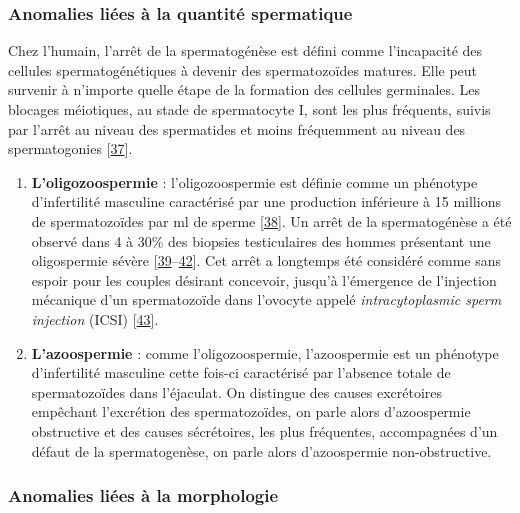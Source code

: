 \documentclass[12pt,twoside]{reedthesis}
\theoremstyle{definition}
\theoremstyle{definition}
\theoremstyle{remark}
\begin{document}
  \newpage
  
  \subsubsection{Anomalies liées à la quantité
  spermatique}\label{infquant}
  
  Chez l'humain, l'arrêt de la spermatogénèse est défini comme
  l'incapacité des cellules spermatogénétiques à devenir des
  spermatozoïdes matures. Elle peut survenir à n'importe quelle étape de
  la formation des cellules germinales. Les blocages méiotiques, au stade
  de spermatocyte I, sont les plus fréquents, suivis par l'arrêt au niveau
  des spermatides et moins fréquemment au niveau des spermatogonies
  {[}\protect\hyperlink{ref-Girgis}{37}{]}.
  
  \begin{enumerate}
  \def\labelenumi{\arabic{enumi}.}
  \item
    \textbf{L'oligozoospermie} : l'oligozoospermie est définie comme un
    phénotype d'infertilité masculine caractérisé par une production
    inférieure à 15 millions de spermatozoïdes par ml de sperme
    {[}\protect\hyperlink{ref-Cooper2010}{38}{]}. Un arrêt de la
    spermatogénèse a été observé dans 4 à 30\% des biopsies testiculaires
    des hommes présentant une oligospermie sévère
    {[}\protect\hyperlink{ref-Colgan1980}{39}--\protect\hyperlink{ref-WONG1973}{42}{]}.
    Cet arrêt a longtemps été considéré comme sans espoir pour les couples
    désirant concevoir, jusqu'à l'émergence de l'injection mécanique d'un
    spermatozoïde dans l'ovocyte appelé \emph{intracytoplasmic sperm
    injection} (ICSI) {[}\protect\hyperlink{ref-Palermo1992}{43}{]}.
  \item
    \textbf{L'azoospermie} : comme l'oligozoospermie, l'azoospermie est un
    phénotype d'infertilité masculine cette fois-ci caractérisé par
    l'absence totale de spermatozoïdes dans l'éjaculat. On distingue des
    causes excrétoires empêchant l'excrétion des spermatozoïdes, on parle
    alors d'azoospermie obstructive et des causes sécrétoires, les plus
    fréquentes, accompagnées d'un défaut de la spermatogenèse, on parle
    alors d'azoospermie non-obstructive.
  \end{enumerate}
  
  \subsubsection{Anomalies liées à la
  morphologie}\label{anomalies-liees-a-la-morphologie}
  
\end{document}

